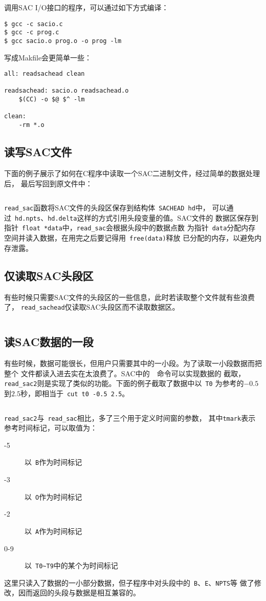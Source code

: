 调用SAC I/O接口的程序，可以通过如下方式编译：
\begin{verbatim}
$ gcc -c sacio.c
$ gcc -c prog.c
$ gcc sacio.o prog.o -o prog -lm
\end{verbatim}

写成Makfile会更简单一些：
\begin{verbatim}
all: readsachead clean

readsachead: sacio.o readsachead.o
    $(CC) -o $@ $^ -lm

clean:
    -rm *.o
\end{verbatim}

\subsection{读写SAC文件}
下面的例子展示了如何在C程序中读取一个SAC二进制文件，经过简单的数据处理后，
最后写回到原文件中：
\inputminted{C}{./sacio/readsac.c}
\verb+read_sac+函数将SAC文件的头段区保存到结构体~\verb+SACHEAD hd+中，
可以通过~\verb+hd.npts+、\verb+hd.delta+这样的方式引用头段变量的值。SAC文件的
数据区保存到指针~\verb+float *data+中，\verb+read_sac+会根据头段中的数据点数
为指针~\verb+data+分配内存空间并读入数据，在用完之后要记得用~\verb+free(data)+释放
已分配的内存，以避免内存泄露。

\subsection{仅读取SAC头段区}
有些时候只需要SAC文件的头段区的一些信息，此时若读取整个文件就有些浪费了，
\verb+read_sachead+仅读取SAC头段区而不读取数据区。
\inputminted{C}{./sacio/readsachead.c}

\subsection{读SAC数据的一段}
有些时候，数据可能很长，但用户只需要其中的一小段。为了读取一小段数据而把整个
文件都读入进去实在太浪费了。SAC中的~~命令可以实现数据的
截取，\verb+read_sac2+则是实现了类似的功能。下面的例子截取了数据中以~\verb+T0+
为参考的$-0.5$到$2.5$秒，即相当于~\verb+cut t0 -0.5 2.5+。
\inputminted{C}{./sacio/readsac2.c}
\verb+read_sac2+与~\verb+read_sac+相比，多了三个用于定义时间窗的参数，
其中\verb+tmark+表示参考时间标记，可以取值为：
\begin{description}
\item[-5] 以~\verb+B+作为时间标记
\item[-3] 以~\verb+O+作为时间标记
\item[-2] 以~\verb+A+作为时间标记
\item[0-9] 以~\verb+T0~T9+中的某个为时间标记
\end{description}
这里只读入了数据的一小部分数据，但子程序中对头段中的~\verb+B+、\verb+E+、\verb+NPTS+等
做了修改，因而返回的头段与数据是相互兼容的。

